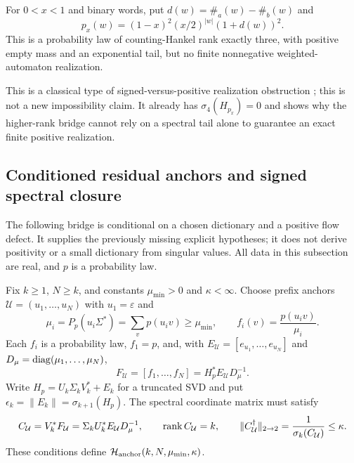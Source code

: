 \begin{proposition}\label{II:U:prop:positive-obstruction}
For $0<x<1$ and binary words, put $d(w)=\#_a(w)-\#_b(w)$ and
\[
 p_x(w)=(1-x)^2(x/2)^{|w|}(1+d(w))^2.
\]
This is a probability law of counting-Hankel rank exactly three, with
positive empty mass and an exponential tail, but no finite nonnegative
weighted-automaton realization.
\end{proposition}

This is a classical type of signed-versus-positive realization obstruction
\citep{denis2008}; this is not a new impossibility claim.
It already has $\sigma_4(H_{p_x})=0$ and shows why the higher-rank bridge
cannot rely on a spectral tail alone to guarantee an exact finite positive
realization.
\subsection{Conditioned residual anchors and signed spectral closure}
\label{II:U:sec:anchored-closure}
The following bridge is conditional on a chosen dictionary and a positive
flow defect. It supplies the previously missing explicit hypotheses; it
does not derive positivity or a small dictionary from singular values.
All data in this subsection are real, and $p$ is a probability law.

\begin{definition}
\label{II:U:def:conditioned-anchors}
Fix $k\ge1$, $N\ge k$, and constants $\mu_{\min}>0$ and
$\kappa<\infty$. Choose prefix anchors
$\mathcal U=(u_1,\ldots,u_N)$ with $u_1=\varepsilon$ and
\[
 \mu_i=P_p(u_i\Sigma^*)=\sum_v p(u_iv)\ge\mu_{\min},\qquad
 f_i(v)=\frac{p(u_iv)}{\mu_i}.
\]
Each $f_i$ is a probability law, $f_1=p$, and, with
$E_{\mathcal U}=[e_{u_1},\ldots,e_{u_N}]$ and
$D_\mu=\operatorname{diag}(\mu_1,\ldots,\mu_N)$,
\[
 F_{\mathcal U}=[f_1,\ldots,f_N]
 =H_p^*E_{\mathcal U}D_\mu^{-1}.
\]
Write $H_p=U_k\Sigma_kV_k^*+E_k$ for a truncated SVD and put
$\epsilon_k=\|E_k\|=\sigma_{k+1}(H_p)$. The spectral coordinate
matrix must satisfy
\begin{equation}
 C_{\mathcal U}=V_k^*F_{\mathcal U}
 =\Sigma_kU_k^*E_{\mathcal U}D_\mu^{-1},\qquad
 \operatorname{rank} C_{\mathcal U}=k,\qquad
 \|C_{\mathcal U}^{\dagger}\|_{2\to2}
 =\frac1{\sigma_k(C_{\mathcal U})}\le\kappa.
 \label{II:U:eq:anchor-coordinates}
\end{equation}
These conditions define
$\mathcal H_{\rm anchor}(k,N,\mu_{\min},\kappa)$.
\end{definition}


